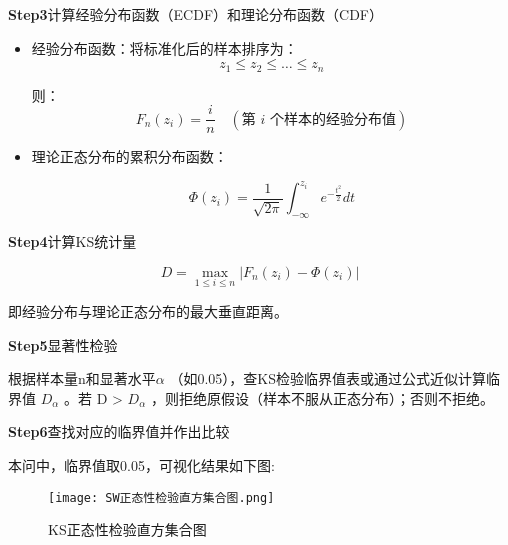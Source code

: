 \documentclass[withoutpreface,bwprint]{cumcmthesis}
\begin{document}
\par

\textbf{Step3}计算经验分布函数（ECDF）和理论分布函数（CDF）
\par
\begin{itemize}[itemindent=2em]

\item 经验分布函数：将标准化后的样本排序为：
\begin{equation}
\label{eq:公式1}
 z_1 \leq z_2 \leq \dots \leq z_n 
\end{equation}
\par
则：
\begin{equation}
\label{eq:公式1}
F_n(z_i) = \frac{i}{n} \quad (\text{第 } i \text{ 个样本的经验分布值})
\end{equation}
\par
\item 理论正态分布的累积分布函数：

\begin{equation}
\label{eq:公式1}
\Phi(z_i) = \frac{1}{\sqrt{2\pi}} \int_{-\infty}^{z_i} e^{-\frac{t^2}{2}} dt
\end{equation}
\par
\end{itemize}

\textbf{Step4}计算KS统计量
\par
\begin{equation}
\label{eq:公式1}
D = \max_{1 \leq i \leq n} \left| F_n(z_i) - \Phi(z_i) \right|
\end{equation}
\par
即经验分布与理论正态分布的最大垂直距离。

\par

\textbf{Step5}显著性检验
\par
根据样本量n和显著水平$\alpha$ （如0.05），查KS检验临界值表或通过公式近似计算临界值  $D_{\alpha}$ 。若  D > $D_{\alpha}$ ，则拒绝原假设（样本不服从正态分布）；否则不拒绝。

\textbf{Step6}查找对应的临界值并作出比较
\par
本问中，临界值取0.05，可视化结果如下图:

\begin{figure}[H]
\centering
\texttt{[image: SW正态性检验直方集合图.png]}
\caption{KS正态性检验直方集合图}
\label{fig:单图}
\end{figure}
\end{document}
